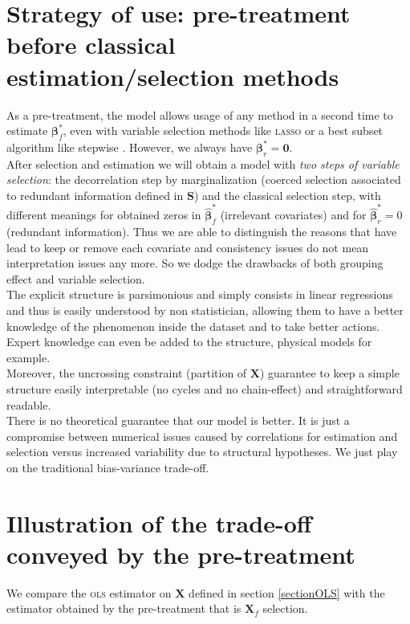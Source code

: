 \documentclass[12pt,a4paper]{report}
\begin{document}
\section{Strategy of use: pre-treatment before classical estimation/selection methods}\label{interpretation}

As a pre-treatment, the model allows usage of any method in a second time to estimate $\boldsymbol{\beta}_{f}^*$, even with variable selection methods like \textsc{lasso} or a best subset algorithm like stepwise \cite{seber2012linear}. However, we always have $\boldsymbol{\beta}^*_r=\boldsymbol{0}$.\\

After selection and estimation we will obtain a model with { \it two steps of variable selection}: the decorrelation step by marginalization (coerced selection associated to redundant information defined in $\boldsymbol{S}$) and the classical selection step, with different meanings for obtained zeros in $\hat{\boldsymbol{\beta}}^*_{f}$ (irrelevant covariates) and for $\hat{\boldsymbol{\beta}}^*_{r}=0$ (redundant information). 
 Thus we are able to distinguish the reasons that have lead to keep or remove each covariate and consistency issues do not mean interpretation issues any more. So we dodge the drawbacks of both grouping effect and variable selection.\\


The explicit structure is parsimonious and simply consists in linear regressions and thus is easily understood by non statistician, allowing them to have a better knowledge of the phenomenon inside the dataset and to take better actions. Expert knowledge can even be added to the structure, physical models for example.\\

Moreover, the uncrossing constraint (partition of $\boldsymbol{X}$) guarantee to keep a simple structure easily interpretable (no cycles and no chain-effect) and straightforward readable.\\
	
			There is no theoretical guarantee that our model is better. It is just a compromise between numerical issues caused by correlations for estimation and selection versus increased variability due to structural hypotheses. We just play on the traditional bias-variance trade-off. 
			

	\section{Illustration of the trade-off conveyed by the pre-treatment}	
	We compare the \textsc{ols} estimator on $\boldsymbol{X}$ defined in section \ref{sectionOLS} with the estimator obtained by the pre-treatment that is $\boldsymbol{X}_f$ selection.
  
\end{document}
